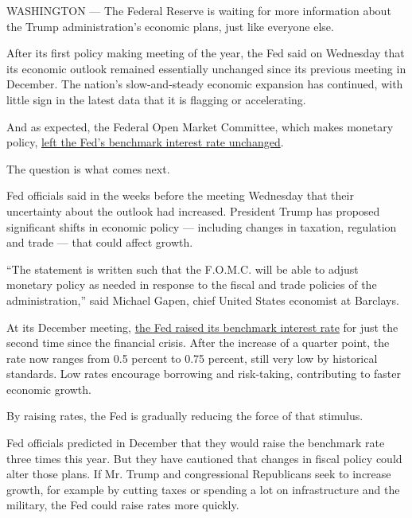 WASHINGTON --- The Federal Reserve is waiting for more information about
the Trump administration's economic plans, just like everyone else.

After its first policy making meeting of the year, the Fed said on
Wednesday that its economic outlook remained essentially unchanged since
its previous meeting in December. The nation's slow-and-steady economic
expansion has continued, with little sign in the latest data that it is
flagging or accelerating.

And as expected, the Federal Open Market Committee, which makes monetary
policy,
\href{https://www.federalreserve.gov/newsevents/press/monetary/20170201a.htm}{left
the Fed's benchmark interest rate unchanged}.

The question is what comes next.

Fed officials said in the weeks before the meeting Wednesday that their
uncertainty about the outlook had increased. President Trump has
proposed significant shifts in economic policy --- including changes in
taxation, regulation and trade --- that could affect growth.

``The statement is written such that the F.O.M.C. will be able to adjust
monetary policy as needed in response to the fiscal and trade policies
of the administration,'' said Michael Gapen, chief United States
economist at Barclays.

At its December meeting,
\href{https://www.nytimes.com/2016/12/14/business/economy/fed-interest-rates-janet-yellen.html?rref=collection\%2Fbyline\%2Fbinyamin-appelbaum\&action=click\&contentCollection=undefined\&region=stream\&module=stream_unit\&version=latest\&contentPlacement=1\&pgtype=collection\&_r=0}{the
Fed raised its benchmark interest rate} for just the second time since
the financial crisis. After the increase of a quarter point, the rate
now ranges from 0.5 percent to 0.75 percent, still very low by
historical standards. Low rates encourage borrowing and risk-taking,
contributing to faster economic growth.

By raising rates, the Fed is gradually reducing the force of that
stimulus.

Fed officials predicted in December that they would raise the benchmark
rate three times this year. But they have cautioned that changes in
fiscal policy could alter those plans. If Mr. Trump and congressional
Republicans seek to increase growth, for example by cutting taxes or
spending a lot on infrastructure and the military, the Fed could raise
rates more quickly.

